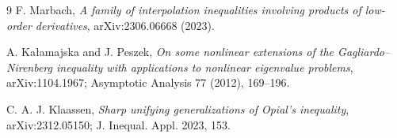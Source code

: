 \documentclass[11pt]{article}
\begin{document}
\begin{thebibliography}{9}
F. Marbach,
\emph{A family of interpolation inequalities involving products of low-order
derivatives}, arXiv:2306.06668 (2023).

A. Ka{\l}amajska and J. Peszek,
\emph{On some nonlinear extensions of the Gagliardo--Nirenberg inequality
with applications to nonlinear eigenvalue problems},
arXiv:1104.1967; Asymptotic Analysis 77 (2012), 169--196.

C. A. J. Klaassen,
\emph{Sharp unifying generalizations of Opial's inequality},
arXiv:2312.05150; J. Inequal. Appl. 2023, 153.
\end{thebibliography}
\end{document}
